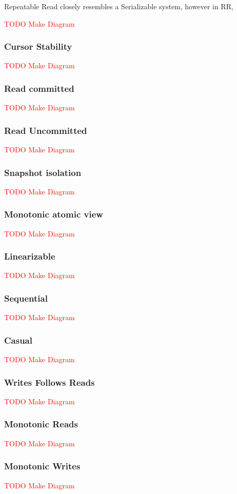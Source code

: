 \documentclass[a4paper,10pt,titlepage]{report}
\begin{document}
Repeatable Read closely resembles a Serializable system, however in RR,


\textcolor{red}{TODO Make Diagram}
\subsubsection{Cursor Stability}
\textcolor{red}{TODO Make Diagram}
\subsubsection{Read committed}
\textcolor{red}{TODO Make Diagram}
\subsubsection{Read Uncommitted}
\textcolor{red}{TODO Make Diagram}
\subsubsection{Snapshot isolation}
\textcolor{red}{TODO Make Diagram}
\subsubsection{Monotonic atomic view}
\textcolor{red}{TODO Make Diagram}
\subsubsection{Linearizable}
\textcolor{red}{TODO Make Diagram}
\subsubsection{Sequential}
\textcolor{red}{TODO Make Diagram}
\subsubsection{Casual}
\textcolor{red}{TODO Make Diagram}
\subsubsection{Writes Follows Reads}
\textcolor{red}{TODO Make Diagram}
\subsubsection{Monotonic Reads}
\textcolor{red}{TODO Make Diagram}
\subsubsection{Monotonic Writes}
\textcolor{red}{TODO Make Diagram}
\end{document}
